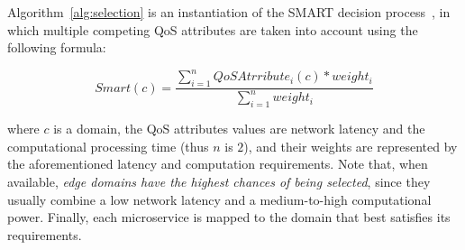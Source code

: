 Algorithm~\ref{alg:selection} is an instantiation of the SMART decision process~\cite{Olson1996}, in which multiple competing QoS attributes are taken into account using the following formula:

\begin{equation}
Smart(c) = \frac{\sum_{i=1}^{n} QoSAtrribute_i(c)*weight_i}{\sum_{i=1}^{n}weight_i} \label{eq:smart}
\end{equation}

\noindent
where $c$ is a domain, the QoS attributes values are network latency and the computational processing time (thus $n$ is $2$), and their weights are represented by the aforementioned latency and computation requirements. Note that, when available, \textit{edge domains have the highest chances of being selected}, since they usually combine a low network latency and a medium-to-high computational power. Finally, each microservice is mapped to the domain that best satisfies its requirements.

